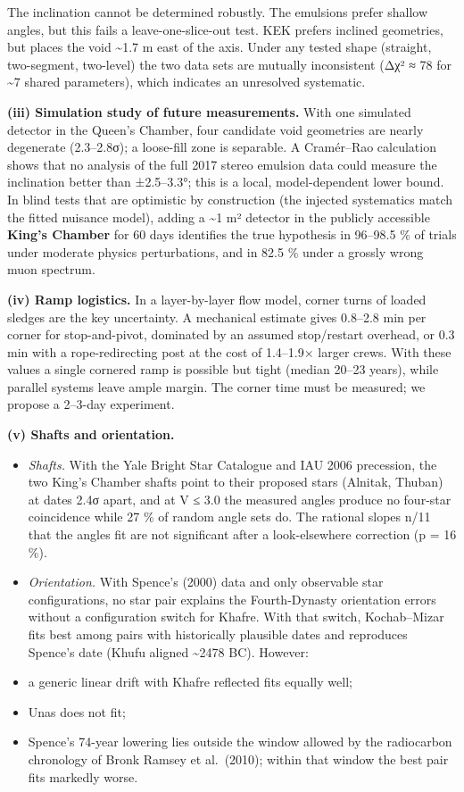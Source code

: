 \documentclass[
]{article}
\begin{document}
The inclination cannot be determined robustly. The emulsions prefer
shallow angles, but this fails a leave-one-slice-out test. KEK prefers
inclined geometries, but places the void \textasciitilde1.7 m east of
the axis. Under any tested shape (straight, two-segment, two-level) the
two data sets are mutually inconsistent (Δχ² ≈ 78 for \textasciitilde7
shared parameters), which indicates an unresolved systematic.

\textbf{(iii) Simulation study of future measurements.} With one
simulated detector in the Queen's Chamber, four candidate void
geometries are nearly degenerate (2.3--2.8σ); a loose-fill zone is
separable. A Cramér--Rao calculation shows that no analysis of the full
2017 stereo emulsion data could measure the inclination better than
±2.5--3.3°; this is a local, model-dependent lower bound. In blind tests
that are optimistic by construction (the injected systematics match the
fitted nuisance model), adding a \textasciitilde1 m² detector in the
publicly accessible \textbf{King's Chamber} for 60 days identifies the
true hypothesis in 96--98.5 \% of trials under moderate physics
perturbations, and in 82.5 \% under a grossly wrong muon spectrum.

\textbf{(iv) Ramp logistics.} In a layer-by-layer flow model, corner
turns of loaded sledges are the key uncertainty. A mechanical estimate
gives 0.8--2.8 min per corner for stop-and-pivot, dominated by an
assumed stop/restart overhead, or 0.3 min with a rope-redirecting post
at the cost of 1.4--1.9× larger crews. With these values a single
cornered ramp is possible but tight (median 20--23 years), while
parallel systems leave ample margin. The corner time must be measured;
we propose a 2--3-day experiment.

\textbf{(v) Shafts and orientation.}

\begin{itemize}
\item
  \emph{Shafts.} With the Yale Bright Star Catalogue and IAU 2006
  precession, the two King's Chamber shafts point to their proposed
  stars (Alnitak, Thuban) at dates 2.4σ apart, and at V ≤ 3.0 the
  measured angles produce no four-star coincidence while 27 \% of random
  angle sets do. The rational slopes n/11 that the angles fit are not
  significant after a look-elsewhere correction (p = 16 \%).
\item
  \emph{Orientation.} With Spence's (2000) data and only observable star
  configurations, no star pair explains the Fourth-Dynasty orientation
  errors without a configuration switch for Khafre. With that switch,
  Kochab--Mizar fits best among pairs with historically plausible dates
  and reproduces Spence's date (Khufu aligned \textasciitilde2478 BC).
  However:
\item
  a generic linear drift with Khafre reflected fits equally well;
\item
  Unas does not fit;
\item
  Spence's 74-year lowering lies outside the window allowed by the
  radiocarbon chronology of Bronk Ramsey et al.~(2010); within that
  window the best pair fits markedly worse.
\end{itemize}
\end{document}
